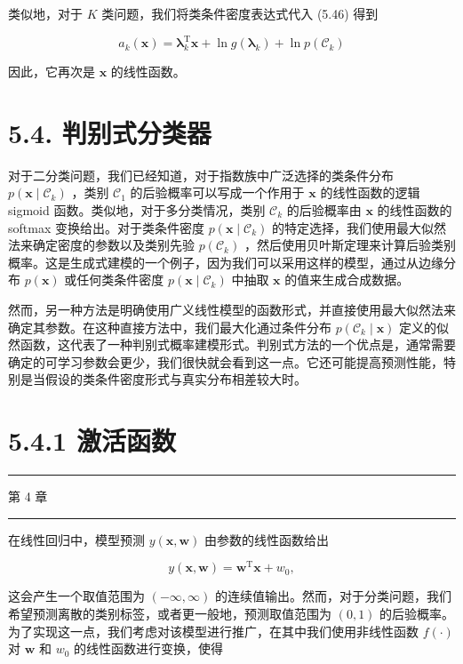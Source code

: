\documentclass[10pt]{article}
\newcommand{\HRule}{\begin{center}\rule{0.9\linewidth}{0.2mm}\end{center}}
\begin{document}
类似地，对于 \(K\) 类问题，我们将类条件密度表达式代入 (5.46) 得到

\[
{a}_{k}\left( \mathbf{x}\right)  = {\mathbf{\lambda }}_{k}^{\mathrm{T}}\mathbf{x} + \ln g\left( {\mathbf{\lambda }}_{k}\right)  + \ln p\left( {\mathcal{C}}_{k}\right)  \tag{5.68}
\]

因此，它再次是 \(\mathbf{x}\) 的线性函数。

\section*{5.4. 判别式分类器}

对于二分类问题，我们已经知道，对于指数族中广泛选择的类条件分布 \(p\left( {\mathbf{x} \mid  {\mathcal{C}}_{k}}\right)\) ，类别 \({\mathcal{C}}_{1}\) 的后验概率可以写成一个作用于 \(\mathbf{x}\) 的线性函数的逻辑 sigmoid 函数。类似地，对于多分类情况，类别 \({\mathcal{C}}_{k}\) 的后验概率由 \(\mathbf{x}\) 的线性函数的 softmax 变换给出。对于类条件密度 \(p\left( {\mathbf{x} \mid  {\mathcal{C}}_{k}}\right)\) 的特定选择，我们使用最大似然法来确定密度的参数以及类别先验 \(p\left( {\mathcal{C}}_{k}\right)\) ，然后使用贝叶斯定理来计算后验类别概率。这是生成式建模的一个例子，因为我们可以采用这样的模型，通过从边缘分布 \(p\left( \mathbf{x}\right)\) 或任何类条件密度 \(p\left( {\mathbf{x} \mid  {\mathcal{C}}_{k}}\right)\) 中抽取 \(\mathbf{x}\) 的值来生成合成数据。

然而，另一种方法是明确使用广义线性模型的函数形式，并直接使用最大似然法来确定其参数。在这种直接方法中，我们最大化通过条件分布 \(p\left( {{\mathcal{C}}_{k} \mid  \mathbf{x}}\right)\) 定义的似然函数，这代表了一种判别式概率建模形式。判别式方法的一个优点是，通常需要确定的可学习参数会更少，我们很快就会看到这一点。它还可能提高预测性能，特别是当假设的类条件密度形式与真实分布相差较大时。

\section*{5.4.1 激活函数}

\HRule

第 4 章

\HRule

在线性回归中，模型预测 \(y\left( {\mathbf{x},\mathbf{w}}\right)\) 由参数的线性函数给出

\[
y\left( {\mathbf{x},\mathbf{w}}\right)  = {\mathbf{w}}^{\mathrm{T}}\mathbf{x} + {w}_{0}, \tag{5.69}
\]

这会产生一个取值范围为 \(\left( {-\infty ,\infty }\right)\) 的连续值输出。然而，对于分类问题，我们希望预测离散的类别标签，或者更一般地，预测取值范围为 \(\left( {0,1}\right)\) 的后验概率。为了实现这一点，我们考虑对该模型进行推广，在其中我们使用非线性函数 \(f\left( \cdot \right)\) 对 \(\mathbf{w}\) 和 \({w}_{0}\) 的线性函数进行变换，使得
\end{document}
